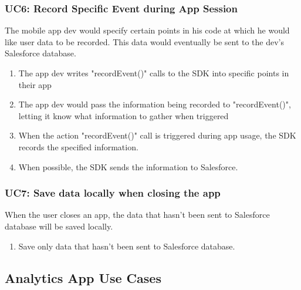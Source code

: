 \documentclass[12pt,oneside,letterpaper]{article}
\begin{document}
\subsubsection{\label{Record Specific Event}UC6: Record Specific Event during App Session}
The mobile app dev would specify certain points in his code at which he would like user data to be recorded. This data would eventually be sent to the dev's Salesforce database.
\begin{enumerate}
\item The app dev writes "recordEvent()" calls to the SDK into specific points in their app
\item The app dev would pass the information being recorded to "recordEvent()", letting it know what information to gather when triggered
\item When the action "recordEvent()" call is triggered during app usage, the SDK records the specified information.
\item When possible, the SDK sends the information to Salesforce.
\end{enumerate}

\subsubsection{\label{Save data locally when closing the app}UC7: Save data locally when closing the app}
When the user closes an app, the data that hasn't been sent to Salesforce database will be saved locally.
\begin{enumerate}
\item Save only data that hasn't been sent to Salesforce database.
\end{enumerate}

\clearpage

\subsection{Analytics App Use Cases}
\end{document}
